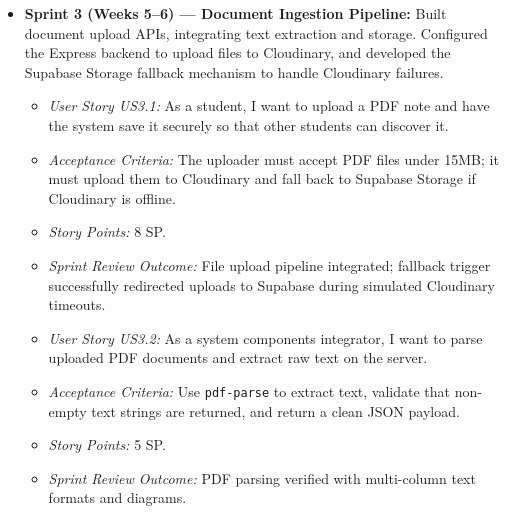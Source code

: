 \documentclass[12,Times new Roman,a4paper]{report}
\begin{document}
\begin{itemize}
    \item \textbf{Sprint 3 (Weeks 5--6) --- Document Ingestion Pipeline:} Built document upload APIs, integrating text extraction and storage. Configured the Express backend to upload files to Cloudinary, and developed the Supabase Storage fallback mechanism to handle Cloudinary failures.
    \begin{itemize}
        \item \textit{User Story US3.1:} As a student, I want to upload a PDF note and have the system save it securely so that other students can discover it.
        \item \textit{Acceptance Criteria:} The uploader must accept PDF files under 15MB; it must upload them to Cloudinary and fall back to Supabase Storage if Cloudinary is offline.
        \item \textit{Story Points:} 8 SP.
        \item \textit{Sprint Review Outcome:} File upload pipeline integrated; fallback trigger successfully redirected uploads to Supabase during simulated Cloudinary timeouts.
    \end{itemize}
    \begin{itemize}
        \item \textit{User Story US3.2:} As a system components integrator, I want to parse uploaded PDF documents and extract raw text on the server.
        \item \textit{Acceptance Criteria:} Use \texttt{pdf-parse} to extract text, validate that non-empty text strings are returned, and return a clean JSON payload.
        \item \textit{Story Points:} 5 SP.
        \item \textit{Sprint Review Outcome:} PDF parsing verified with multi-column text formats and diagrams.
    \end{itemize}
    

\end{itemize}
\end{document}
